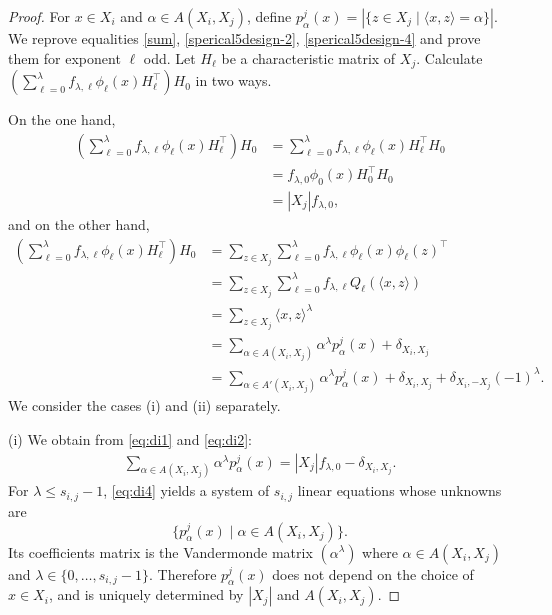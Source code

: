 \documentclass[11pt]{article}
\theoremstyle{definition}
\theoremstyle{remark}
\begin{document}
\begin{proof}
    For $x\in X_i$ and $\alpha\in A(X_i,X_j)$, define $p_{\alpha}^j(x)=|\{z\in X_j \mid \langle x,z\rangle=\alpha \}|$. 
    We reprove equalities \eqref{sum}, \eqref{sperical5design-2}, \eqref{sperical5design-4} and prove them for exponent $\ell$ odd. 
    Let $H_\ell$ be a characteristic matrix of $X_j$. 
    Calculate $(\sum_{\ell=0}^\lambda f_{\lambda,\ell}\phi_{\ell}(x)H_{\ell}^\top)H_0$ in two ways. 

    On the one hand, 
    \begin{align}
        (\sum_{\ell=0}^\lambda f_{\lambda,\ell}\phi_{\ell}(x)H_{\ell}^\top)H_0&=\sum_{\ell=0}^\lambda f_{\lambda,\ell}\phi_{\ell}(x)H_{\ell}^\top H_0\nonumber\\
        &=f_{\lambda,0}\phi_{0}(x)H_{0}^\top H_0\nonumber\\
        &=|X_j|f_{\lambda,0},\label{eq:di1} 
    \end{align}
    and on the other hand, 
    \begin{align}
        (\sum_{\ell=0}^\lambda f_{\lambda,\ell}\phi_{\ell}(x)H_{\ell}^\top)H_0&=\sum_{z\in X_j}\sum_{\ell=0}^\lambda f_{\lambda,\ell}\phi_{\ell}(x)\phi_{\ell}(z)^\top \nonumber\\
        &=\sum_{z\in X_j}\sum_{\ell=0}^\lambda f_{\lambda,\ell}Q_{\ell}(\langle x,z\rangle)\nonumber\\
        &=\sum_{z\in X_j}\langle x,z\rangle^\lambda\nonumber\\
        &=\sum_{\alpha\in A(X_i,X_j)}\alpha^\lambda p_{\alpha}^j(x)+\delta_{X_i,X_j} \label{eq:di2}\\
        &=\sum_{\alpha\in A'(X_i,X_j)}\alpha^\lambda p_{\alpha}^j(x)+\delta_{X_i,X_j}+\delta_{X_i,-X_j}(-1)^\lambda. \label{eq:di3}
    \end{align}
    We consider the cases (i) and (ii) separately. 
    
    (i) We obtain from \eqref{eq:di1} and \eqref{eq:di2}:   
    \begin{align}\label{eq:di4}
        \sum_{\alpha\in A(X_i,X_j)}\alpha^\lambda p_{\alpha}^j(x)=|X_j|f_{\lambda,0}-\delta_{X_i,X_j}.
    \end{align}
    For $\lambda\leq s_{i,j}-1$, \eqref{eq:di4} yields  a system of $s_{i,j}$ linear equations whose unknowns are
    \[
    \{p_{\alpha}^j(x) \mid \alpha\in A(X_i,X_j)\}. 
    \]
    Its coefficients matrix is 
 the Vandermonde matrix $(\alpha^\lambda)$ where $\alpha\in A(X_i,X_j)$ and $\lambda\in\{0,\ldots,s_{i,j}-1\}$. 
 Therefore $p_{\alpha}^j(x)$ does not depend on the choice of $x\in X_i$, and is uniquely determined by $|X_j|$ and $A(X_i,X_j)$. 
 

\end{proof}
\end{document}
